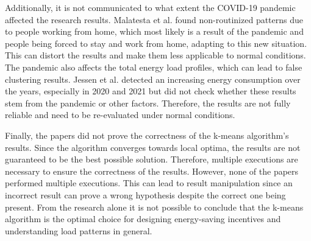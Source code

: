 Additionally, it is not communicated to what extent the COVID-19 pandemic affected the research results.
Malatesta et al. \cite{MAL-HBP} found non-routinized patterns due to people working from home, which most likely is a result of the pandemic and people being forced to stay and work from home, adapting to this new situation.
This can distort the results and make them less applicable to normal conditions.
The pandemic also affects the total energy load profiles, which can lead to false clustering results.
Jessen et al. \cite{JES-IND} detected an increasing energy consumption over the years, especially in 2020 and 2021 but did not check whether these results stem from the pandemic or other factors.
Therefore, the results are not fully reliable and need to be re-evaluated under normal conditions.

Finally, the papers did not prove the correctness of the k-means algorithm's results.
Since the algorithm converges towards local optima, the results are not guaranteed to be the best possible solution.
Therefore, multiple executions are necessary to ensure the correctness of the results.
However, none of the papers performed multiple executions.
This can lead to result manipulation since an incorrect result can prove a wrong hypothesis despite the correct one being present.
From the research alone it is not possible to conclude that the k-means algorithm is the optimal choice for designing energy-saving incentives and understanding load patterns in general.

